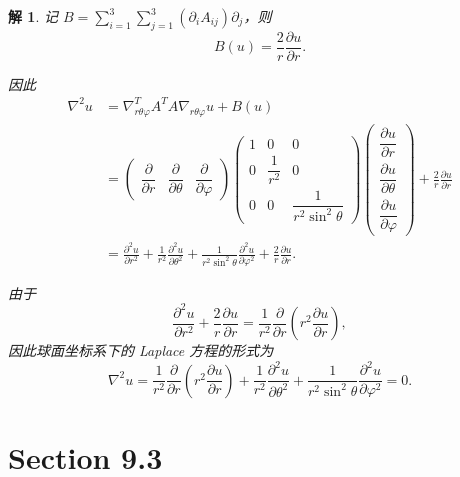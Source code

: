 \documentclass[a4paper,12pt]{article}
\newtheorem*{sol}{解}
\begin{document}
\begin{sol}
    记 $B = \displaystyle\sum_{i=1}^3\sum_{j=1}^3 (\partial_i A_{ij})\partial_j$，则
    $$
        B(u) = \frac{2}{r}\frac{\partial u}{\partial r}.
    $$
    
    因此
    \begin{align*}
        \nabla^2u & = \nabla_{r\theta\varphi}^T A^T A \nabla_{r\theta\varphi}u + B(u) \\
                  & = \begin{pmatrix}
                          \dfrac{\partial}{\partial r} & \dfrac{\partial}{\partial \theta} & \dfrac{\partial}{\partial \varphi}
                      \end{pmatrix}
                      \begin{pmatrix}
                          1 & 0 & 0 \\
                          0 & \dfrac{1}{r^2} & 0 \\
                          0 & 0 & \dfrac{1}{r^2\sin^2\theta}
                      \end{pmatrix}
                      \begin{pmatrix}
                          \dfrac{\partial u}{\partial r} \\[6pt]
                          \dfrac{\partial u}{\partial \theta} \\[6pt]
                          \dfrac{\partial u}{\partial \varphi}
                      \end{pmatrix} + \frac{2}{r}\frac{\partial u}{\partial r} \\
                  & = \frac{\partial^2 u}{\partial r^2} + \frac{1}{r^2}\frac{\partial^2 u}{\partial \theta^2} + \frac{1}{r^2\sin^2\theta}\frac{\partial^2 u}{\partial \varphi^2} + \frac{2}{r}\frac{\partial u}{\partial r}.
    \end{align*}
    
    由于
    $$
        \frac{\partial^2 u}{\partial r^2} + \frac{2}{r}\frac{\partial u}{\partial r} = \frac{1}{r^2}\frac{\partial}{\partial r}\left(r^2\frac{\partial u}{\partial r}\right),
    $$
    因此球面坐标系下的 Laplace 方程的形式为
    $$
        \nabla^2u = \frac{1}{r^2}\frac{\partial}{\partial r}\left(r^2\frac{\partial u}{\partial r}\right) + \frac{1}{r^2}\frac{\partial^2 u}{\partial \theta^2} + \frac{1}{r^2\sin^2\theta}\frac{\partial^2 u}{\partial \varphi^2} = 0.
    $$
\end{sol}

\section*{Section 9.3}
\end{document}
